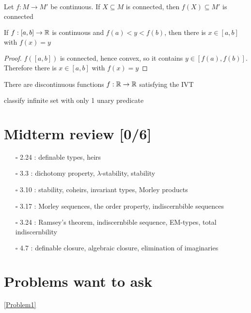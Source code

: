 \documentclass[11pt]{article}
\begin{document}
\begin{proposition}[]
Let \(f:M\to M'\) be continuous. If \(X\subseteq M\) is connected, then \(f(X)\subseteq M'\) is connected
\end{proposition}

\begin{corollary}
If \(f:[a,b]\to\mathbb{R}\) is continuous and \(f(a)<y<f(b)\), then there is \(x\in[a,b]\) with \(f(x)=y\)
\end{corollary}

\begin{proof}
\(f([a,b])\) is connected, hence convex, so it contains \(y\in[f(a),f(b)]\). Therefore there
is \(x\in[a,b]\) with \(f(x)=y\)
\end{proof}

There are discontinuous functions \(f:\mathbb{R}\to\mathbb{R}\) satisfying the IVT

classify infinite set with only 1 unary predicate

\section{Midterm review [0/6]}
\label{sec:orge5882b4}
\begin{itemize}
\item[{$\square$}] 2.24 : definable types, heirs
\item[{$\square$}] 3.3 : dichotomy property, \(\lambda\)-stability, stability
\item[{$\square$}] 3.10 : stability, coheirs, invariant types, Morley products
\item[{$\square$}] 3.17 : Morley sequences, the order property, indiscernbible sequences
\item[{$\square$}] 3.24 : Ramsey's theorem, indiscernbible sequence, EM-types, total indiscernbility
\item[{$\square$}] 4.7 : definable closure, algebraic closure, elimination of imaginaries
\end{itemize}
\section{Problems want to ask}
\label{sec:orgdf3ee68}
\ref{Problem1}
\end{document}
